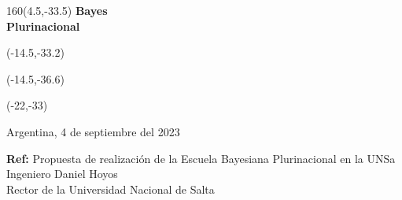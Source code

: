\documentclass[a4paper,10pt]{letter}
\begin{document}
\begin{letter}

\begin{textblock}{160}(4.5,-33.5)
\noindent \Huge\textbf{Bayes \\ Plurinacional \\}
\end{textblock}
\begin{textblock}{80}(-14.5,-33.2)
\LARGE  {}
\end{textblock}
\begin{textblock}{80}(-14.5,-36.6)
\LARGE {\scalebox{5}{$p$}}
\end{textblock}
\begin{textblock}{80}(-22,-33)
\LARGE {\scalebox{2.505}{$($}}
\end{textblock}




\vspace{-3.5cm}

\begin{flushright}
Argentina, 4 de septiembre del 2023  \\
\end{flushright}

\noindent

\hfill \textbf{Ref:} Propuesta de realización de la Escuela Bayesiana Plurinacional en la UNSa \\


\noindent Ingeniero Daniel Hoyos \\
\noindent Rector de la Universidad Nacional de Salta\\ [0cm]


\end{letter}
\end{document}
